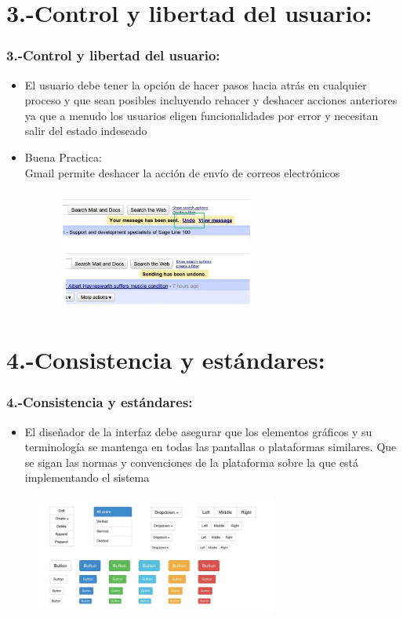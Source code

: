 \documentclass[11pt]{beamer}
\begin{document}
\section{3.-Control y libertad del usuario:}
\begin{frame}
\frametitle{3.-Control y libertad del usuario:}

\begin{itemize}
\item El usuario debe tener la opción de hacer pasos hacia atrás en cualquier proceso y que sean posibles incluyendo rehacer y deshacer acciones anteriores ya que a menudo los usuarios eligen funcionalidades por error y necesitan salir del estado indeseado
\item Buena Practica:\\ Gmail permite deshacer la acción de envío de correos electrónicos
\end{itemize}

\begin{figure}
  \centering
  \includegraphics[width=8.0cm,height=4.0cm]{img/Imagen3.jpg}
\end{figure}
\end{frame}

\section{4.-Consistencia y estándares:}
\begin{frame}
\frametitle{4.-Consistencia y estándares:}

\begin{itemize}
\item El diseñador de la interfaz debe asegurar que los elementos gráficos y su terminología se mantenga en todas las pantallas o plataformas similares. Que se sigan las normas y convenciones de la plataforma sobre la que está implementando el sistema
\end{itemize}

\begin{figure}
  \centering
  \includegraphics[width=8.0cm,height=4.0cm]{img/Imagen4.jpg}
\end{figure}
\end{frame}
\end{document}
